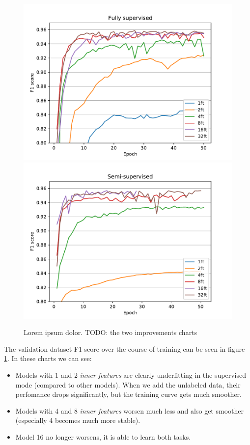 \begin{figure}[p]
    \centering
    \includegraphics[width=140mm]{../../figures/02-cvc-improvements/supervised.pdf}
    \includegraphics[width=140mm]{../../figures/02-cvc-improvements/semisupervised.pdf}
    \caption{Lorem ipsum dolor. TODO: the two improvements charts}
    \label{fig:CvcImprovements}
\end{figure}

The validation dataset F1 score over the course of training can be seen in figure \ref{fig:CvcImprovements}. In these charts we can see:

\begin{itemize}
    \item Models with 1 and 2 \emph{inner features} are clearly underfitting in the supervised mode (compared to other models). When we add the unlabeled data, their perfomance drops significantly, but the training curve gets much smoother.
    \item Models with 4 and 8 \emph{inner features} worsen much less and also get smoother (especially 4 becomes much more stable).
    \item Model 16 no longer worsens, it is able to learn both tasks.
\end{itemize}

